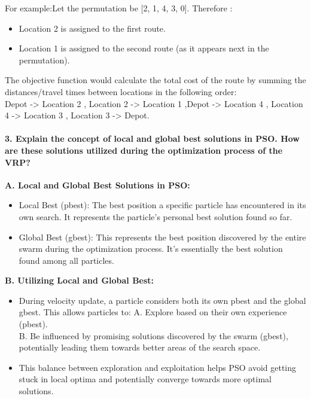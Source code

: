 \documentclass[letterpaper, 12pt]{article}
\begin{document}
For example:Let the permutation be [2, 1, 4, 3, 0]. Therefore :
\begin{itemize}
    \item Location 2 is assigned to the first route.
    \item Location 1 is assigned to the second route (as it appears next in the permutation).
\end{itemize}

The objective function would calculate the total cost of the route by summing the distances/travel times between locations in the following order:\\

Depot -> Location 2 , Location 2 -> Location 1 ,Depot -> Location 4 , Location 4 -> Location 3 , Location 3 -> Depot. \\

\paragraph{3. Explain the concept of local and global best solutions in PSO. How are these solutions utilized during the optimization process of the VRP?\\} 


\textbf{A. Local and Global Best Solutions in PSO:}
\begin{itemize}
    \item Local Best (pbest): The best position a specific particle has encountered in its own search. It represents the particle's personal best solution found so far.
    \item Global Best (gbest): This represents the best position discovered by the entire swarm during the optimization process. It's essentially the best solution found among all particles.
\end{itemize}


\textbf{B. Utilizing Local and Global Best:}

\begin{itemize}
    \item During velocity update, a particle considers both its own pbest and the global gbest. This allows particles to:
        A. Explore based on their own experience (pbest).\\
        B. Be influenced by promising solutions discovered by the swarm (gbest), potentially leading them towards better areas of the search space.\\
    \item This balance between exploration and exploitation helps PSO avoid getting stuck in local optima and potentially converge towards more optimal solutions.
\end{itemize}
\end{document}
